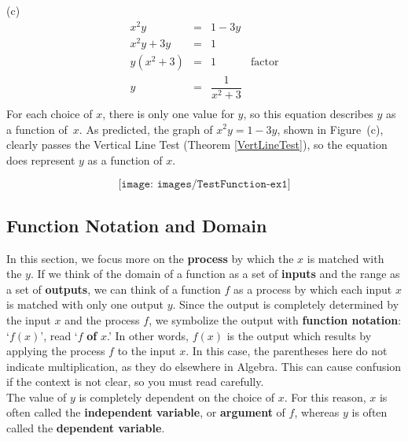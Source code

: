 \begin{solution}
(c) 
  \[ \begin{array}{rclr} 
		x^2y & = & 1 - 3y & \\
		x^2y + 3y & = & 1 & \\
		y \left(x^2 + 3\right) & = & 1 & \mbox{factor} \\
		y & = & \dfrac{1}{x^2 + 3} & \\ 
		\end{array} \]
     For each choice of $x$, there is only one value for $y$, so this equation describes $y$ as a function of~$x$. 		
     As predicted, the graph of $x^2y=1-3y$, shown in Figure~(c), clearly passes the Vertical Line Test (Theorem \ref{VertLineTest}), so the equation does represent $y$ as a function of $x$.\\   

\begin{figure}[H]	
$$\texttt{[image: images/TestFunction-ex1]}$$
\caption{\label{fig:graphFT}} 
\end{figure}
\end{solution}


\subsection{Function Notation and Domain}

 In this section, we focus more on the \textbf{process}  by which the $x$ is matched with the $y$.  If we think of the domain of a function as a set of \textbf{inputs} and the range as a set of \textbf{outputs}, we can think of a function $f$ as a process by which each input $x$ is matched with only one output $y$.  Since the output is completely determined by the input $x$ and the process $f$, we symbolize the output with  \textbf{function notation}: `$f(x)$', read `$f$ \textbf{of} $x$.' In other words, $f(x)$ is the output which results by applying the process $f$ to the input $x$.  In this case, the parentheses here do not indicate multiplication, as they do elsewhere in Algebra.  This can cause confusion if the context is not clear, so you must read carefully. \\
 
 The value of $y$ is completely dependent on the choice of $x$.  For this reason,  $x$ is often called the    \textbf{independent variable}, or   \textbf{argument} of $f$, whereas $y$ is often called the    \textbf{dependent variable}. 
 
